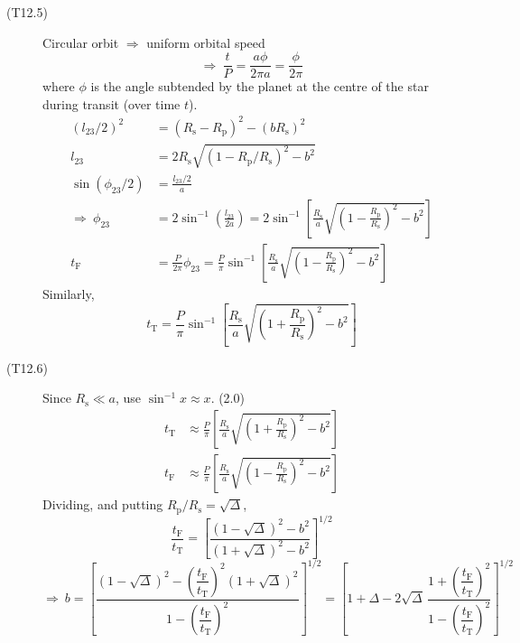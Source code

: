 \begin{description}
\item[(T12.5)] Circular orbit $\Rightarrow$ uniform orbital speed
\[
\Rightarrow\ \frac{t}{P} = \frac{a\phi}{2\pi a} = \frac{\phi}{2\pi}
  \tag*{(1.0)}
\]
where $\phi$ is the angle subtended by the planet at the centre of the star
during transit (over time $t$).
\begin{align*}
(l_{23}/2)^2 &= (R_{\mathrm{s}} - R_{\mathrm{p}})^2 - (bR_{\mathrm{s}})^2\\
l_{23} &= 2R_{\mathrm{s}}\sqrt{(1 - R_{\mathrm{p}}/R_{\mathrm{s}})^2 - b^2}
  \tag*{(2.0)}\\
\sin(\phi_{23}/2) &= \frac{l_{23}/2}{a} \tag*{(2.0)}\\
\Rightarrow\ \phi_{23} &= 2\sin^{-1}\left(\frac{l_{23}}{2a}\right)
 = 2\sin^{-1}\left[\frac{R_{\mathrm{s}}}{a}
   \sqrt{\left(1 - \frac{R_{\mathrm{p}}}{R_{\mathrm{s}}}\right)^2 - b^2}
   \right] \tag*{(1.0)}\\
t_{\mathrm{F}} &= \frac{P}{2\pi}\phi_{23}
 = \frac{P}{\pi}\sin^{-1}\left[\frac{R_{\mathrm{s}}}{a}
   \sqrt{\left(1 - \frac{R_{\mathrm{p}}}{R_{\mathrm{s}}}\right)^2 - b^2}
   \right] \tag*{(1.0)}
\end{align*}
Similarly,
\[
t_{\mathrm{T}} = \frac{P}{\pi}\sin^{-1}\left[\frac{R_{\mathrm{s}}}{a}
  \sqrt{\left(1 + \frac{R_{\mathrm{p}}}{R_{\mathrm{s}}}\right)^2 - b^2}
  \right] \tag*{(1.0)}
\]

\item[(T12.6)] Since $R_{\mathrm{s}} \ll a$, use $\sin^{-1}x \approx x$.
\hfill(2.0)
\begin{align*}
t_{\mathrm{T}} &\approx \frac{P}{\pi}\left[\frac{R_{\mathrm{s}}}{a}
  \sqrt{\left(1 + \frac{R_{\mathrm{p}}}{R_{\mathrm{s}}}\right)^2 - b^2}
  \right]\\
t_{\mathrm{F}} &\approx \frac{P}{\pi}\left[\frac{R_{\mathrm{s}}}{a}
  \sqrt{\left(1 - \frac{R_{\mathrm{p}}}{R_{\mathrm{s}}}\right)^2 - b^2}
  \right]
\end{align*}
Dividing, and putting $R_{\mathrm{p}}/R_{\mathrm{s}} = \sqrt{\Delta}$,
\[
\frac{t_{\mathrm{F}}}{t_{\mathrm{T}}}
 = \left[\frac{(1 - \sqrt{\Delta})^2 - b^2}
              {(1 + \sqrt{\Delta})^2 - b^2}\right]^{1/2} \tag*{(1.0)}
\]
\[
\Rightarrow\ b = \left[\frac{(1 - \sqrt{\Delta})^2
  - \left(\dfrac{t_{\mathrm{F}}}{t_{\mathrm{T}}}\right)^2
    (1 + \sqrt{\Delta})^2}
  {1 - \left(\dfrac{t_{\mathrm{F}}}{t_{\mathrm{T}}}\right)^2}\right]^{1/2}
 = \left[1 + \Delta - 2\sqrt{\Delta}\,
   \frac{1 + \left(\dfrac{t_{\mathrm{F}}}{t_{\mathrm{T}}}\right)^2}
        {1 - \left(\dfrac{t_{\mathrm{F}}}{t_{\mathrm{T}}}\right)^2}
   \right]^{1/2} \tag*{(2.0)}
\]


\end{description}
